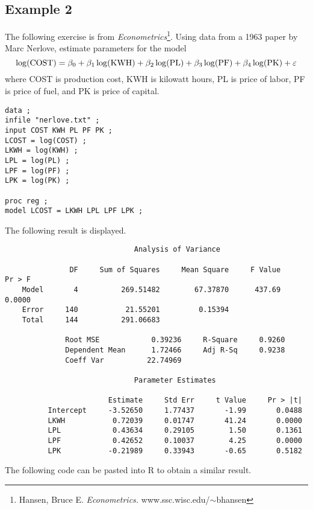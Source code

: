 \documentclass[12pt]{article}
\begin{document}
\subsection*{Example 2}

The following exercise is from {\it Econometrics}\footnote{
Hansen, Bruce E. {\it Econometrics.}
www.ssc.wisc.edu/$\sim$bhansen}.
Using data from a 1963 paper by Marc Nerlove,
estimate parameters for the model
\[
\log({\rm COST})=\beta_0+\beta_1\log({\rm KWH})
+\beta_2\log({\rm PL})+\beta_3\log({\rm PF})+\beta_4\log({\rm PK})
+\varepsilon
\]
where COST is production cost,
KWH is kilowatt hours,
PL is price of labor,
PF is price of fuel,
and PK is price of capital.

{\scriptsize\begin{verbatim}
data ;
infile "nerlove.txt" ;
input COST KWH PL PF PK ;
LCOST = log(COST) ;
LKWH = log(KWH) ;
LPL = log(PL) ;
LPF = log(PF) ;
LPK = log(PK) ;

proc reg ;
model LCOST = LKWH LPL LPF LPK ;
\end{verbatim}}

The following result is displayed.

{\scriptsize\begin{verbatim}
                              Analysis of Variance

               DF     Sum of Squares     Mean Square     F Value     Pr > F
    Model       4          269.51482        67.37870      437.69     0.0000
    Error     140           21.55201         0.15394                       
    Total     144          291.06683                                       

              Root MSE            0.39236     R-Square     0.9260
              Dependent Mean      1.72466     Adj R-Sq     0.9238
              Coeff Var          22.74969                        

                              Parameter Estimates

                        Estimate     Std Err     t Value     Pr > |t|
          Intercept     -3.52650     1.77437       -1.99       0.0488
          LKWH           0.72039     0.01747       41.24       0.0000
          LPL            0.43634     0.29105        1.50       0.1361
          LPF            0.42652     0.10037        4.25       0.0000
          LPK           -0.21989     0.33943       -0.65       0.5182
\end{verbatim}}

The following code can be pasted into R to obtain a similar result.
\end{document}
